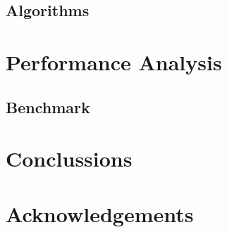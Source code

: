 \documentclass[11pt,a4paper]{globis-book}
\begin{document}
\section{Algorithms}

\chapter{Performance Analysis}
\section{Benchmark}

\chapter{Conclussions}

\appendix

\listoffigures
\listoftables

\chapter*{Acknowledgements}

\newpage
\thispagestyle{empty}



\end{document}
